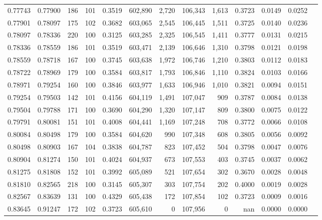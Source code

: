 \begin{tabular}{rrrrrrrrrrrrr}
0.77743 & 0.77900 &   186 & 101 &                                     0.3519 & 602,890 &   2,720 & 106,343 &   1,613 & 0.3723 & 0.0149 & 0.0252 \\
0.77901 & 0.78097 &   175 & 102 &                                     0.3682 & 603,065 &   2,545 & 106,445 &   1,511 & 0.3725 & 0.0140 & 0.0236 \\
0.78097 & 0.78336 &   220 & 100 &                                     0.3125 & 603,285 &   2,325 & 106,545 &   1,411 & 0.3777 & 0.0131 & 0.0215 \\
0.78336 & 0.78559 &   186 & 101 &                                     0.3519 & 603,471 &   2,139 & 106,646 &   1,310 & 0.3798 & 0.0121 & 0.0198 \\
0.78559 & 0.78718 &   167 & 100 &                                     0.3745 & 603,638 &   1,972 & 106,746 &   1,210 & 0.3803 & 0.0112 & 0.0183 \\
0.78722 & 0.78969 &   179 & 100 &                                     0.3584 & 603,817 &   1,793 & 106,846 &   1,110 & 0.3824 & 0.0103 & 0.0166 \\
0.78971 & 0.79254 &   160 & 100 &                                     0.3846 & 603,977 &   1,633 & 106,946 &   1,010 & 0.3821 & 0.0094 & 0.0151 \\
0.79254 & 0.79503 &   142 & 101 &                                     0.4156 & 604,119 &   1,491 & 107,047 &     909 & 0.3787 & 0.0084 & 0.0138 \\
0.79504 & 0.79788 &   171 & 100 &                                     0.3690 & 604,290 &   1,320 & 107,147 &     809 & 0.3800 & 0.0075 & 0.0122 \\
0.79791 & 0.80081 &   151 & 101 &                                     0.4008 & 604,441 &   1,169 & 107,248 &     708 & 0.3772 & 0.0066 & 0.0108 \\
0.80084 & 0.80498 &   179 & 100 &                                     0.3584 & 604,620 &     990 & 107,348 &     608 & 0.3805 & 0.0056 & 0.0092 \\
0.80498 & 0.80903 &   167 & 104 &                                     0.3838 & 604,787 &     823 & 107,452 &     504 & 0.3798 & 0.0047 & 0.0076 \\
0.80904 & 0.81274 &   150 & 101 &                                     0.4024 & 604,937 &     673 & 107,553 &     403 & 0.3745 & 0.0037 & 0.0062 \\
0.81275 & 0.81808 &   152 & 101 &                                     0.3992 & 605,089 &     521 & 107,654 &     302 & 0.3670 & 0.0028 & 0.0048 \\
0.81810 & 0.82565 &   218 & 100 &                                     0.3145 & 605,307 &     303 & 107,754 &     202 & 0.4000 & 0.0019 & 0.0028 \\
0.82567 & 0.83639 &   131 & 100 &                                     0.4329 & 605,438 &     172 & 107,854 &     102 & 0.3723 & 0.0009 & 0.0016 \\
0.83645 & 0.91247 &   172 & 102 &                                     0.3723 & 605,610 &       0 & 107,956 &       0 &    nan & 0.0000 & 0.0000 \\
\bottomrule
\end{tabular}
